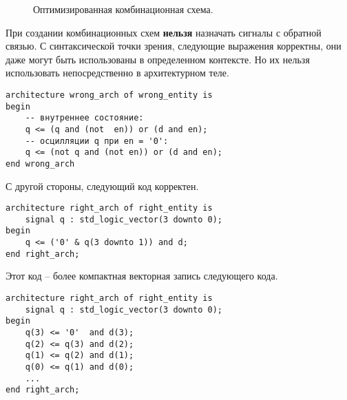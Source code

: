 \begin{figure}[ht]
\centering
{}
\caption{Оптимизированная комбинационная схема.}
\label{comb_circuit_opt}
\end{figure}

При создании комбинационных схем \textbf{нельзя} назначать сигналы с обратной связью. С синтаксической точки зрения, следующие выражения корректны, они даже могут быть использованы в определенном контексте. Но их нельзя использовать непосредственно в архитектурном теле.

\begin{Code}
\begin{lstlisting}
architecture wrong_arch of wrong_entity is
begin
    -- внутреннее состояние:
    q <= (q and (not  en)) or (d and en);
    -- осцилляции q при en = '0':
    q <= (not q and (not en)) or (d and en);
end wrong_arch
\end{lstlisting}
\end{Code}
С другой стороны, следующий код корректен.
\begin{Code}
\begin{lstlisting}
architecture right_arch of right_entity is
    signal q : std_logic_vector(3 downto 0);
begin
    q <= ('0' & q(3 downto 1)) and d;
end right_arch;
\end{lstlisting}
\end{Code}

Этот код – более компактная векторная запись следующего кода.

\begin{Code}
\begin{lstlisting}
architecture right_arch of right_entity is
    signal q : std_logic_vector(3 downto 0);
begin
    q(3) <= '0'  and d(3);
    q(2) <= q(3) and d(2);
    q(1) <= q(2) and d(1);
    q(0) <= q(1) and d(0);
    ...
end right_arch;
\end{lstlisting}
\end{Code}

